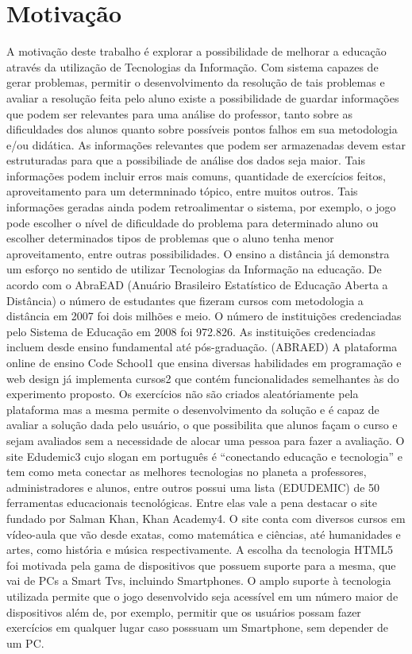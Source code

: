 \section{Motivação}
A motivação deste trabalho é explorar a possibilidade de melhorar a educação através da utilização de Tecnologias da Informação. Com sistema capazes de gerar problemas, permitir o desenvolvimento da resolução de tais problemas e avaliar a resolução feita pelo aluno existe a possibilidade de guardar informações que podem ser relevantes para uma análise do professor, tanto sobre as dificuldades dos alunos quanto sobre possíveis pontos falhos em sua metodologia e/ou didática.
	As informações relevantes que podem ser armazenadas devem estar estruturadas para que a possibiliade de análise dos dados seja maior. Tais informações podem incluir erros mais comuns, quantidade de exercícios feitos, aproveitamento para um determninado tópico, entre muitos outros. Tais informações geradas ainda podem retroalimentar o sistema, por exemplo, o jogo pode escolher o  nível de dificuldade do problema para determinado aluno ou escolher determinados tipos de problemas que o aluno tenha menor aproveitamento, entre outras possibilidades.
	O ensino a distância já demonstra um esforço no sentido de utilizar Tecnologias da Informação na educação. De acordo com o AbraEAD (Anuário Brasileiro Estatístico de Educação Aberta a Distância) o número de estudantes que fizeram cursos com metodologia a distância em 2007 foi dois milhões e meio. O número de instituições credenciadas pelo Sistema de Educação em 2008 foi 972.826. As instituições credenciadas incluem desde ensino fundamental até pós-graduação. (ABRAED)
	A plataforma online de ensino Code School1 que ensina diversas habilidades em programação e web design já implementa cursos2 que contém funcionalidades semelhantes às do experimento proposto. Os exercícios não são criados aleatóriamente pela plataforma mas a mesma permite o desenvolvimento da solução e é capaz de avaliar a solução dada pelo usuário, o que possibilita que alunos façam o curso e sejam avaliados sem a necessidade de alocar uma pessoa para fazer a avaliação.
	O site Edudemic3 cujo slogan em português é “conectando educação e tecnologia” e tem como meta conectar as melhores tecnologias no planeta a professores, administradores e alunos, entre outros possui uma lista (EDUDEMIC) de 50 ferramentas educacionais tecnológicas. Entre elas vale a pena destacar o site fundado por Salman Khan, Khan Academy4. O site conta com diversos cursos em vídeo-aula que vão desde exatas, como matemática e ciências, até humanidades e artes, como história e música respectivamente.
	A escolha da tecnologia HTML5 foi motivada pela gama de dispositivos que possuem suporte para a mesma, que vai de PCs a Smart Tvs, incluindo Smartphones. O amplo suporte à tecnologia utilizada permite que o jogo desenvolvido seja acessível em um número maior de dispositivos além de, por exemplo, permitir que os usuários possam fazer exercícios em qualquer lugar caso posssuam um Smartphone, sem depender de um PC.
	
